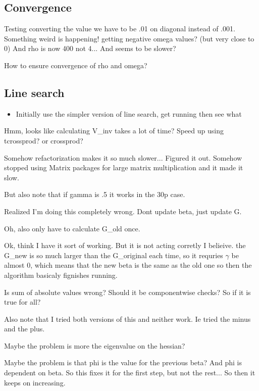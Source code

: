 \documentclass[10pt]{article}
\theoremstyle{definition}
\begin{document}
\subsection{Convergence}

Testing converting the value we have to be .01 on diagonal instead of .001.
Something weird is happening! getting negative omega values? (but very close to 0) And rho is now 400 not 4...
And seems to be slower?

How to ensure convergence of rho and omega?

\subsection{Line search }

\begin{itemize}
  \item Initially use the simpler version of line search, get running then see what
\end{itemize}

Hmm, looks like calculating V\_inv takes a lot of time? Speed up using tcrossprod? or crossprod?


Somehow refactorization makes it so much slower... Figured it out. Somehow stopped using Matrix packages for large matrix multiplication and it made it slow.

But also note that if gamma is .5 it works in the 30p case.

Realized I'm doing this completely wrong. Dont update beta, just update G.

Oh, also only have to calculate G\_old once.


Ok, think I have it sort of working. But it is not acting corretly I belieive. the G\_new is so much larger than the G\_original each time, so it requries $\gamma$ be almost 0, which means that the new beta is the same as the old one so then the algorithm basicaly fignishes running.

Is sum of absolute values wrong? Should it be componentwise checks? So if it is true for all?


Also note that I tried both versions of this and neither work. Ie tried the minus and the plus.

Maybe the problem is more the eigenvalue on the hessian?

Maybe the problem is that phi is the value for the previous beta? And phi is dependent on beta. So this fixes it for the first step, but not the rest... So then it keeps on increasing.
\end{document}
